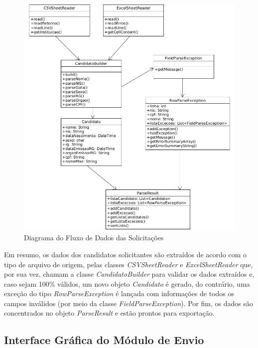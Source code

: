 \documentclass[
	12pt,			%
	openright,		%
	oneside,	
	a4paper,		%
	english,		%
	brazil			%
]{abntex2/abntex2}  %
\begin{document}
				\begin{figure}[ht]
					\begin{center}
						
						\caption{Diagrama do Fluxo de Dados das Solicitações}
						\label{envio-uml}
						
						\includegraphics[scale=0.6]{img/envio-uml}
						
					\end{center}
				\end{figure}
	
				Em resumo, os dados dos candidatos solicitantes são extraídos de acordo com o tipo de arquivo de origem, pelas classes \textit{CSVSheetReader} e \textit{ExcelSheetReader} que, por sua vez, chamam a classe \textit{CandidatoBuilder} para validar os dados extraídos e, caso sejam 100\% válidos, um novo objeto \textit{Candidato} é gerado, do contrário, uma exceção do tipo \textit{RowParseException} é lançada com informações de todos os campos inválidos (por meio da classe \textit{FieldParseException}). Por fim, os dados são concentrados no objeto \textit{ParseResult} e estão prontos para exportação.
	
			\subsection{Interface Gráfica do Módulo de Envio}
	
\end{document}
